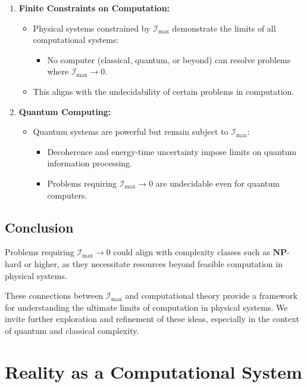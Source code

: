 \documentclass[12pt]{article}
\begin{document}
\begin{enumerate}
    \item \textbf{Finite Constraints on Computation:}
    \begin{itemize}
        \item Physical systems constrained by $\mathcal{I}_{\text{max}}$ demonstrate the limits of all computational systems:
        \begin{itemize}
            \item No computer (classical, quantum, or beyond) can resolve problems where $\mathcal{I}_{\text{max}} \to 0$.
        \end{itemize}
        \item This aligns with the undecidability of certain problems in computation.
    \end{itemize}

    \item \textbf{Quantum Computing:}
    \begin{itemize}
        \item Quantum systems are powerful but remain subject to $\mathcal{I}_{\text{max}}$:
        \begin{itemize}
            \item Decoherence and energy-time uncertainty impose limits on quantum information processing.
            \item Problems requiring $\mathcal{I}_{\text{max}} \to 0$ are undecidable even for quantum computers.
        \end{itemize}
    \end{itemize}
\end{enumerate}

\subsection{Conclusion}

Problems requiring $\mathcal{I}_{\text{max}} \to 0$ could align with complexity classes such as $\mathbf{NP}$-hard or higher, as they necessitate resources beyond feasible computation in physical systems. 

These connections between $\mathcal{I}_{\text{max}}$ and computational theory provide a framework for understanding the ultimate limits of computation in physical systems. We invite further exploration and refinement of these ideas, especially in the context of quantum and classical complexity.


\section{Reality as a Computational System}
\end{document}
